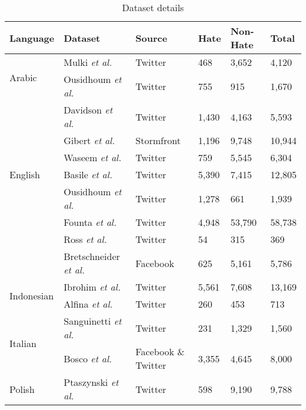 \documentclass[runningheads]{llncs}
\begin{document}
\begin{table}[!htb]
\centering
\caption{Dataset details}
\label{tab:dataset_stats}
\begin{tabular}{llllll}
Language                 & Dataset & Source        & Hate & Non-Hate & Total \\\hline
\multirow{2}{*}{Arabic} & Mulki \textit{et al.}~\cite{mulki2019hsab} &   Twitter & 468 & 3,652    & 4,120 \\
         & Ousidhoum \textit{et al.}~\cite{ousidhoum2019multilingual} &  Twitter &   755 &  915 & 1,670 \\\hline
\multirow{7}{*}{English} & Davidson \textit{et al.}~\cite{davidson2017automated}    & Twitter       & 1,430 & 4,163    & 5,593 \\
                         &  Gibert \textit{et al.}~\cite{de2018hate}     &    Stormfront  & 1,196 & 9,748     & 10,944 \\
                         & Waseem \textit{et al.}~\cite{waseem2016hateful} &  Twitter & 759  & 5,545     & 6,304  \\
                         & Basile \textit{et al.}~\cite{basile2019semeval} &   Twitter &  5,390 & 7,415     & 12,805 \\
                    &Ousidhoum \textit{et al.}~\cite{ousidhoum2019multilingual} &    Twitter &    1,278   &   661 &  1,939 \\
&Founta \textit{et al.}~\cite{founta2018large} & Twitter &  4,948& 53,790  &    58,738 \\\hline
\multirow{2}{*}{German} & Ross \textit{et al.}~\cite{ross2017measuring} &   Twitter   &   54  &  315 & 369 \\
         & Bretschneider \textit{et al.}~\cite{bretschneider2017detecting} & Facebook    & 625 &   5,161   &   5,786 \\\hline
\multirow{2}{*}{Indonesian} & Ibrohim \textit{et al.}~\cite{ibrohim2019multi} &    Twitter &   5,561   &  7,608   & 13,169 \\
         & Alfina \textit{et al.}~\cite{alfina2017hate} & Twitter & 260 &    453 &   713 \\\hline         
\multirow{2}{*}{Italian} & Sanguinetti \textit{et al.}~\cite{sanguinetti2018italian}&  Twitter & 231 &    1,329   &   1,560 \\
         &Bosco \textit{et al.}~\cite{bosco2018overview} &  Facebook \& Twitter &  3,355 & 4,645   &    8,000 \\\hline         
\multirow{1}{*}{Polish} &Ptaszynski \textit{et al.}~\cite{ptaszynski2019results} &   Twitter &   598    &  9,190   & 9,788 \\\hline   

\end{tabular}
\end{table}
\end{document}
